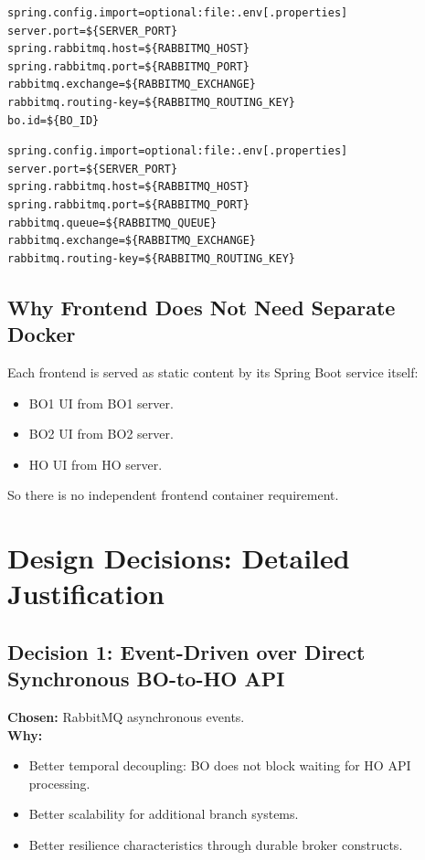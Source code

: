 \documentclass[11pt,a4paper]{article}
\begin{document}
\begin{lstlisting}[style=propstyle,caption={BO relevant properties}]
spring.config.import=optional:file:.env[.properties]
server.port=${SERVER_PORT}
spring.rabbitmq.host=${RABBITMQ_HOST}
spring.rabbitmq.port=${RABBITMQ_PORT}
rabbitmq.exchange=${RABBITMQ_EXCHANGE}
rabbitmq.routing-key=${RABBITMQ_ROUTING_KEY}
bo.id=${BO_ID}
\end{lstlisting}

\begin{lstlisting}[style=propstyle,caption={HO relevant properties}]
spring.config.import=optional:file:.env[.properties]
server.port=${SERVER_PORT}
spring.rabbitmq.host=${RABBITMQ_HOST}
spring.rabbitmq.port=${RABBITMQ_PORT}
rabbitmq.queue=${RABBITMQ_QUEUE}
rabbitmq.exchange=${RABBITMQ_EXCHANGE}
rabbitmq.routing-key=${RABBITMQ_ROUTING_KEY}
\end{lstlisting}

\subsection{Why Frontend Does Not Need Separate Docker}
Each frontend is served as static content by its Spring Boot service itself:
\begin{itemize}[leftmargin=*]
  \item BO1 UI from BO1 server.
  \item BO2 UI from BO2 server.
  \item HO UI from HO server.
\end{itemize}
So there is no independent frontend container requirement.

\section{Design Decisions: Detailed Justification}
\subsection{Decision 1: Event-Driven over Direct Synchronous BO-to-HO API}
\textbf{Chosen:} RabbitMQ asynchronous events.\\
\textbf{Why:}
\begin{itemize}[leftmargin=*]
  \item Better temporal decoupling: BO does not block waiting for HO API processing.
  \item Better scalability for additional branch systems.
  \item Better resilience characteristics through durable broker constructs.
\end{itemize}
\end{document}
